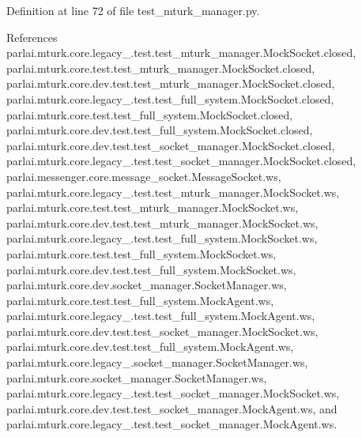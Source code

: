 Definition at line 72 of file test\+\_\+mturk\+\_\+manager.\+py.



References parlai.\+mturk.\+core.\+legacy\+\_.\+test.\+test\+\_\+mturk\+\_\+manager.\+Mock\+Socket.\+closed, parlai.\+mturk.\+core.\+test.\+test\+\_\+mturk\+\_\+manager.\+Mock\+Socket.\+closed, parlai.\+mturk.\+core.\+dev.\+test.\+test\+\_\+mturk\+\_\+manager.\+Mock\+Socket.\+closed, parlai.\+mturk.\+core.\+legacy\+\_.\+test.\+test\+\_\+full\+\_\+system.\+Mock\+Socket.\+closed, parlai.\+mturk.\+core.\+test.\+test\+\_\+full\+\_\+system.\+Mock\+Socket.\+closed, parlai.\+mturk.\+core.\+dev.\+test.\+test\+\_\+full\+\_\+system.\+Mock\+Socket.\+closed, parlai.\+mturk.\+core.\+dev.\+test.\+test\+\_\+socket\+\_\+manager.\+Mock\+Socket.\+closed, parlai.\+mturk.\+core.\+legacy\+\_.\+test.\+test\+\_\+socket\+\_\+manager.\+Mock\+Socket.\+closed, parlai.\+messenger.\+core.\+message\+\_\+socket.\+Message\+Socket.\+ws, parlai.\+mturk.\+core.\+legacy\+\_.\+test.\+test\+\_\+mturk\+\_\+manager.\+Mock\+Socket.\+ws, parlai.\+mturk.\+core.\+test.\+test\+\_\+mturk\+\_\+manager.\+Mock\+Socket.\+ws, parlai.\+mturk.\+core.\+dev.\+test.\+test\+\_\+mturk\+\_\+manager.\+Mock\+Socket.\+ws, parlai.\+mturk.\+core.\+legacy\+\_.\+test.\+test\+\_\+full\+\_\+system.\+Mock\+Socket.\+ws, parlai.\+mturk.\+core.\+test.\+test\+\_\+full\+\_\+system.\+Mock\+Socket.\+ws, parlai.\+mturk.\+core.\+dev.\+test.\+test\+\_\+full\+\_\+system.\+Mock\+Socket.\+ws, parlai.\+mturk.\+core.\+dev.\+socket\+\_\+manager.\+Socket\+Manager.\+ws, parlai.\+mturk.\+core.\+test.\+test\+\_\+full\+\_\+system.\+Mock\+Agent.\+ws, parlai.\+mturk.\+core.\+legacy\+\_.\+test.\+test\+\_\+full\+\_\+system.\+Mock\+Agent.\+ws, parlai.\+mturk.\+core.\+dev.\+test.\+test\+\_\+socket\+\_\+manager.\+Mock\+Socket.\+ws, parlai.\+mturk.\+core.\+dev.\+test.\+test\+\_\+full\+\_\+system.\+Mock\+Agent.\+ws, parlai.\+mturk.\+core.\+legacy\+\_.\+socket\+\_\+manager.\+Socket\+Manager.\+ws, parlai.\+mturk.\+core.\+socket\+\_\+manager.\+Socket\+Manager.\+ws, parlai.\+mturk.\+core.\+legacy\+\_.\+test.\+test\+\_\+socket\+\_\+manager.\+Mock\+Socket.\+ws, parlai.\+mturk.\+core.\+dev.\+test.\+test\+\_\+socket\+\_\+manager.\+Mock\+Agent.\+ws, and parlai.\+mturk.\+core.\+legacy\+\_.\+test.\+test\+\_\+socket\+\_\+manager.\+Mock\+Agent.\+ws.

\mbox{\label{classparlai_1_1mturk_1_1core_1_1test_1_1test__mturk__manager_1_1MockSocket_ab9a60af1ed619d0f22407addd7e7414a}} 

